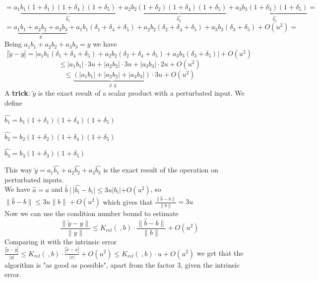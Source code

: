 \documentclass[10pt]{report}
\begin{document}
$$ = a_1\underset{\hat{b_1}}{\underbrace{b_1(1+\delta_1)(1+\delta_4)(1+\delta_5)}} + a_2\underset{\hat{b_2}}{\underbrace{b_2(1+\delta_2)(1+\delta_4)(1+\delta_5)}} + a_3\underset{\hat{b_3}}{\underbrace{b_3(1+\delta_3)(1+\delta_5)}} = $$
$$ = \underset{y}{\underbrace{a_1b_1+a_2b_2+a_3b_3}} + a_1b_1(\delta_1+\delta_4+\delta_5) + a_2b_2(\delta_2+\delta_4+\delta_5) + a_3b_3(\delta_3+\delta_5) + O(u^2) = $$
Being $a_1b_1+a_2b_2+a_3b_3 = y$ we have 
$$|\tilde{y} - y| = |a_1b_1(\delta_1+\delta_4+\delta_5) + a_2b_2(\delta_2+\delta_4+\delta_5) + a_3b_3(\delta_3+\delta_5)| + O(u^2)$$
$$\leq |a_1b_1|\cdot3u + |a_2b_2|\cdot3u + |a_3b_3|\cdot2u + O(u^2)$$
$$\leq \underset{\neq y}{\underbrace{\left(|a_1b_1|+|a_2b_2|+|a_3b_3|\right)}}\cdot 3u + O(u^2)$$
A \textbf{trick}: $\tilde{y}$ is the exact result of a scalar product with a perturbated input. We define \begin{list}{}{}
	\item $\hat{b_1} = b_1(1+\delta_1)(1+\delta_4)(1+\delta_5)$
	\item $\hat{b_2} = b_2(1+\delta_2)(1+\delta_4)(1+\delta_5)$
	\item $\hat{b_3} = b_3(1+\delta_3)(1+\delta_5)$
\end{list}
This way $\tilde{y} = a_1\hat{b_1}+a_2\hat{b_2}+a_3\hat{b_3}$ is the exact result of the operation on perturbated inputs.\\
We have $\hat{a} = a$ and $\hat{b}\:|\:|\hat{b_i}-b_i|\leq 3u|b_i|+O(u^2)$, so $\|\hat{b}-b\|\leq 3u\|b\|+O(u^2)$ which gives that $\frac{\|\hat{b}-b\|}{\|b\|} = 3u$\\
Now we can use the condition number bound to estimate
$$\frac{\|\tilde{y}-y\|}{\|y\|}\leq K_{rel}(\:,b)\cdot\frac{\|\hat{b}-b\|}{\|b\|} + O(u^2)$$
Comparing it with the intrinsic error $\frac{|\tilde{y}-y|}{|y|}\leq K_{rel}(\:,b)\cdot\frac{|\tilde{x}-x|}{|x|} + O(u^2)\leq K_{rel}(\:,b)\cdot u + O(u^2)$ we get that the  algorithm is "as good as possible", apart from the factor $3$, given the intrinsic error.
\end{document}
